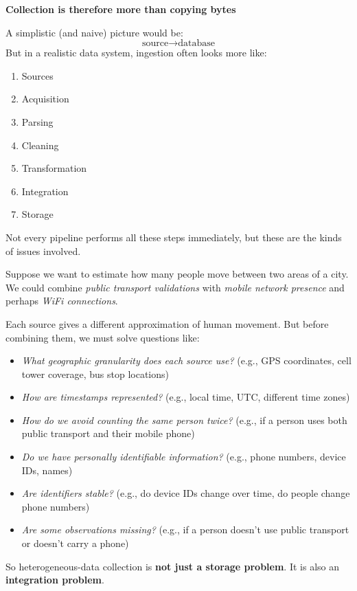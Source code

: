 \begin{flushleft}
    \textcolor{Green3}{ \textbf{Collection is therefore more than copying bytes}}
\end{flushleft}
A simplistic (and naive) picture would be:
\begin{equation*}
    \text{source}
    \rightarrow
    \text{database}
\end{equation*}
But in a realistic data system, ingestion often looks more like:
\begin{enumerate}
    \item Sources
    \item Acquisition
    \item Parsing
    \item Cleaning
    \item Transformation
    \item Integration
    \item Storage
\end{enumerate}
Not every pipeline performs all these steps immediately, but these are the kinds of issues involved.

\highspace
\begin{examplebox}
    Suppose we want to estimate how many people move between two areas of a city. We could combine \emph{public transport validations} with \emph{mobile network presence} and perhaps \emph{WiFi connections}.

    \highspace
    Each source gives a different approximation of human movement. But before combining them, we must solve questions like:
    \begin{itemize}
        \item \emph{What geographic granularity does each source use?} (e.g., GPS coordinates, cell tower coverage, bus stop locations)
        \item \emph{How are timestamps represented?} (e.g., local time, UTC, different time zones)
        \item \emph{How do we avoid counting the same person twice?} (e.g., if a person uses both public transport and their mobile phone)
        \item \emph{Do we have personally identifiable information?} (e.g., phone numbers, device IDs, names)
        \item \emph{Are identifiers stable?} (e.g., do device IDs change over time, do people change phone numbers)
        \item \emph{Are some observations missing?} (e.g., if a person doesn't use public transport or doesn't carry a phone)
    \end{itemize}
    So heterogeneous-data collection is \textbf{not just a storage problem}. It is also an \textbf{integration problem}.
\end{examplebox}

